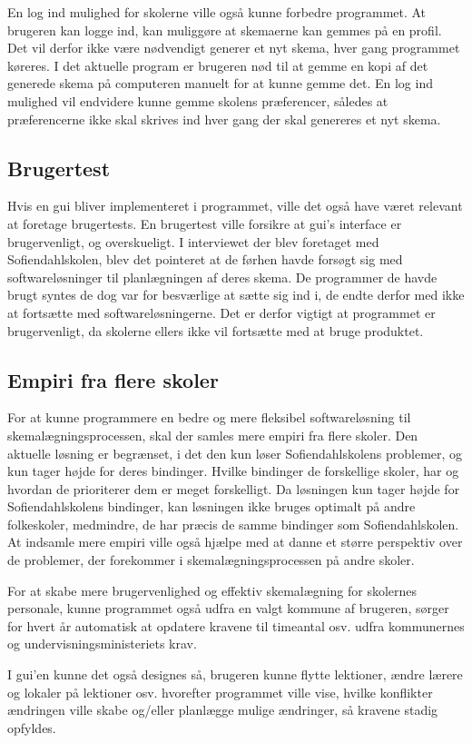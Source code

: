 En log ind mulighed for skolerne ville også kunne forbedre programmet. At brugeren kan logge ind, kan muliggøre at skemaerne kan gemmes på en profil. Det vil derfor ikke være nødvendigt generer et nyt skema, hver gang programmet køreres. I det aktuelle program er brugeren nød til at gemme en kopi af det generede skema på computeren manuelt for at kunne gemme det. En log ind mulighed vil endvidere kunne gemme skolens præferencer, således at præferencerne ikke skal skrives ind hver gang der skal genereres et nyt skema. 
\subsection{Brugertest}

Hvis en gui bliver implementeret i programmet, ville det også have været relevant at foretage brugertests. En brugertest ville forsikre at gui’s interface er brugervenligt, og overskueligt. I interviewet der blev foretaget med Sofiendahlskolen, blev det pointeret at de førhen havde forsøgt sig med softwareløsninger til planlægningen af deres skema. De programmer de havde brugt syntes de dog var for besværlige at sætte sig ind i, de endte derfor med ikke at fortsætte med softwareløsningerne. Det er derfor vigtigt at programmet er brugervenligt, da skolerne ellers ikke vil fortsætte med at bruge produktet. 
\subsection{Empiri fra flere skoler}

For at kunne programmere en bedre og mere fleksibel softwareløsning til skemalægningsprocessen, skal der samles mere empiri fra flere skoler. Den aktuelle løsning er begrænset, i det den kun løser Sofiendahlskolens problemer, og kun tager højde for deres bindinger. Hvilke bindinger de forskellige skoler, har og hvordan de prioriterer dem er meget forskelligt. Da løsningen kun tager højde for Sofiendahlskolens bindinger, kan løsningen ikke bruges optimalt på andre folkeskoler, medmindre, de har præcis de samme bindinger som Sofiendahlskolen. At indsamle mere empiri ville også hjælpe med at danne et større perspektiv over de problemer, der forekommer i skemalægningsprocessen på andre skoler. 

For at skabe mere brugervenlighed og effektiv skemalægning for skolernes personale, kunne programmet også udfra en valgt kommune af brugeren, sørger for hvert år automatisk at opdatere kravene til timeantal osv. udfra kommunernes og undervisningsministeriets krav.

I gui'en kunne det også designes så, brugeren kunne flytte lektioner, ændre lærere og lokaler på lektioner osv. hvorefter programmet ville vise, hvilke konflikter ændringen ville skabe og/eller planlægge mulige ændringer, så kravene stadig opfyldes.

